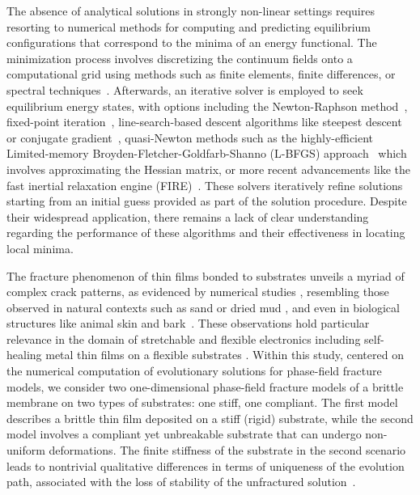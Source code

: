 \documentclass[10pt]{article}
\begin{document}
The absence of analytical solutions in strongly non-linear settings requires resorting to numerical methods for computing and predicting equilibrium configurations that correspond to the minima of an energy functional. The minimization process involves discretizing the continuum fields onto a computational grid using methods such as finite elements, finite differences, or spectral techniques~\cite{Salman2009-qv,Liu2013-sj,Hu2021-mq}. Afterwards, an iterative solver is employed to seek equilibrium energy states, with options including the Newton-Raphson method~\cite{Wick2017-bo}, fixed-point iteration~\cite{Chen2019-mn,Kirkesaether_Brun2020-wa,Storvik2021-cd}, line-search-based descent algorithms like steepest descent or conjugate gradient~\cite{Stiefel1952-fw,Dai1999-hz}, quasi-Newton methods such as the highly-efficient Limited-memory Broyden-Fletcher-Goldfarb-Shanno (\textsc{L-BFGS}) approach~\cite{Liu1989-kl} which involves approximating the Hessian matrix, or more recent advancements like the fast inertial relaxation engine (\textsc{FIRE})~\cite{Guenole2020-tc}. These solvers iteratively refine solutions starting from an initial guess provided as part of the solution procedure. Despite their widespread application, there remains a lack of clear understanding regarding the performance of these algorithms and their effectiveness in locating local minima. 

%
%

The fracture phenomenon of thin films bonded to substrates unveils a myriad of complex crack patterns, as evidenced by numerical studies \cite{Baldelli2014-ho,Alessi2019-bx,Hu2020-nt,Salman2021-mn,Baldelli2021-gc}, resembling those observed in natural contexts such as sand or dried mud \cite{Goehring2010-xz}, and even in biological structures like animal skin \cite{Qin2014-wz} and bark~\cite{chattaway:1955, shen:2020}. These observations hold particular relevance in the domain of stretchable and flexible electronics \cite{Faurie2019-to,Godard2022-ss} including  self-healing metal thin films on a flexible substrates \cite{Trost2024-ca}. 
Within this study, centered on the numerical computation of evolutionary solutions for phase-field fracture models, we consider two one-dimensional phase-field fracture models of a brittle membrane on two types of substrates: one stiff, one compliant. The first model describes a brittle thin film deposited on a stiff (rigid) substrate, while the second model involves a compliant yet unbreakable substrate that can undergo non-uniform deformations. The finite stiffness of the substrate in the second scenario leads to nontrivial qualitative differences in terms of uniqueness of the evolution path, associated with  the loss of stability of the unfractured solution~\cite{Baldelli2014-ho,Kuhn2015-rt,Baldelli2021-gc,Harandi2023-cd}.
\end{document}
